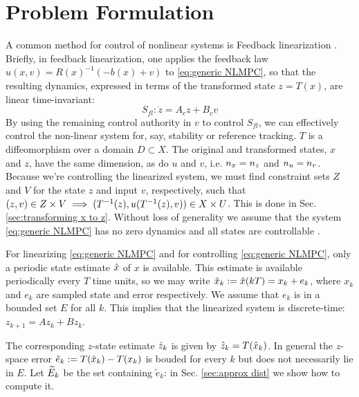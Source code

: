 \section{Problem Formulation} 
\label{sec:formulation}
A common method for control of nonlinear systems is Feedback linearization \cite{khalil}. 
Briefly, in feedback linearization, one applies the feedback law $u(x,v) = R(x)^{-1}(-b(x)+v)$ to \eqref{eq:generic NLMPC}, so that the resulting dynamics, expressed in terms of the transformed state $z = T(x)$, are linear time-invariant:
\begin{equation}
\label{eq:LTI_fb_lin}
S_{fl}: \dot{z} = A_cz + B_cv
\end{equation}
By using the remaining control authority in $v$ to control $S_{fl}$, we can effectively control the non-linear system for, say, stability or reference tracking.
$T$ is a diffeomorphism over a domain $D \subset X$.
The original and transformed states, $x$ and $z$, have the same dimension, as do $u$ and $v$, i.e. $n_x = n_z$ and $n_u = n_v$.
Because we're controlling the linearized system, we must find constraint sets $Z$ and $V$ for the state $z$ and input $v$, respectively, such that $(z,v) \in Z\times V \implies (T^{-1}(z), u(T^{-1}(z), v)) \in X \times U$.
This is done in Sec. \ref{sec:transforming x to z}.
Without loss of generality we assume that the system \eqref{eq:generic NLMPC} has no zero dynamics and all states are controllable \cite{khalil}. 

For linearizing \eqref{eq:generic NLMPC} and for controlling \eqref{eq:generic NLMPC}, only a periodic state estimate $\hat{x}$ of $x$ is available.
This estimate is available periodically every $T$ time units, so we may write $\hat{x}_{k} := \hat{x}(kT) = x_k + e_k$, where $x_k$ and $e_k$ are sampled state and error respectively.
We assume that $e_k$ is in a bounded set $E$ for all $k$.
This implies that the linearized system is discrete-time: $z_{k+1} = Az_k + B z_k$.

The corresponding $z$-state estimate $\hat{z}_{k}$ is given by $\hat{z}_{k} = T(\hat{x}_{k})$.
In general the $z$-space error $\tilde{e}_k := T(\hat{x}_k) - T(x_k)$ is bouded for every $k$ but does not necessarily lie in $E$.
Let $\widetilde{E}_{k}$ be the set containing $\tilde{e}_k$: in Sec. \ref{sec:approx dist} we show how to compute it.

